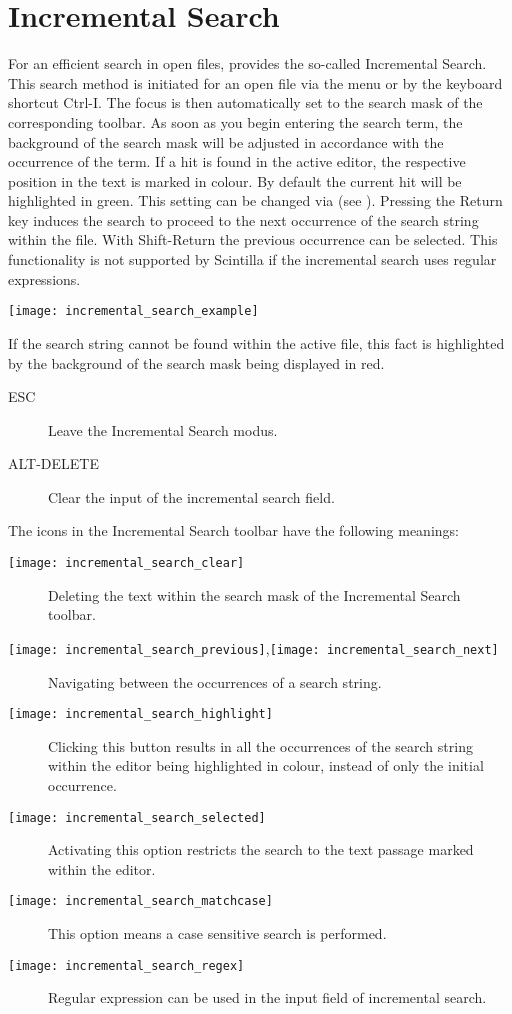 \section{Incremental Search}

For an efficient search in open files, \codeblocks provides the so-called Incremental Search. This search method is initiated for an open file via the menu  or by the keyboard shortcut Ctrl-I. The focus is then automatically set to the search mask of the corresponding toolbar. As soon as you begin entering the search term, the background of the search mask will be adjusted in accordance with the occurrence of the term. If a hit is found in the active editor, the respective position in the text is marked in colour. By default the current hit will be highlighted in green. This setting can be changed via  (see ). Pressing the Return key induces the search to proceed to the next occurrence of the search string within the file. With Shift-Return the previous occurrence can be selected. This functionality is not supported by Scintilla if the incremental search uses regular expressions.

\texttt{[image: incremental\_search\_example]}

If the search string cannot be found within the active file, this fact is highlighted by the background of the search mask being displayed in red.

\begin{description}
\item[ESC] Leave the Incremental Search modus.
\item[ALT-DELETE] Clear the input of the incremental search field.
\end{description}

The icons in the Incremental Search toolbar have the following meanings:

\begin{description}
\item[\texttt{[image: incremental\_search\_clear]}] Deleting the text within the search mask of the Incremental Search toolbar.
\item[\texttt{[image: incremental\_search\_previous]},\texttt{[image: incremental\_search\_next]}] Navigating between the occurrences of a search string.
\item[\texttt{[image: incremental\_search\_highlight]}] Clicking this button results in all the occurrences of the search string within the editor being highlighted in colour, instead of only the initial occurrence.
\item[\texttt{[image: incremental\_search\_selected]}] Activating this option restricts the search to the text passage marked within the editor.
\item[\texttt{[image: incremental\_search\_matchcase]}] This option means a case sensitive search is performed.
\item[\texttt{[image: incremental\_search\_regex]}] Regular expression can be used in the input field of incremental search.
\end{description}


